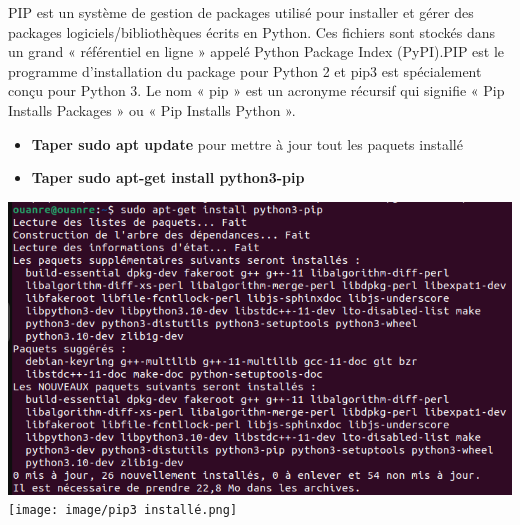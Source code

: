 \documentclass[12pt,a4paper]{article}
\begin{document}
PIP est un système de gestion de packages utilisé pour installer et gérer des packages logiciels/bibliothèques écrits en Python. Ces fichiers sont stockés dans un grand « référentiel en ligne » appelé Python Package Index (PyPI).PIP est le programme d'installation du package pour Python 2 et pip3 est spécialement conçu pour Python 3. Le nom « pip » est un acronyme récursif qui signifie « Pip Installs Packages » ou « Pip Installs Python ». \\
\begin{itemize}
\item \textbf{Taper sudo apt update} pour mettre à jour tout les paquets installé
\item \textbf{Taper sudo apt-get install python3-pip} \\
\end{itemize}
\includegraphics[scale=0.5]{image/instalation de pip3.png} \\

\texttt{[image: image/pip3 installé.png]}
\end{document}
